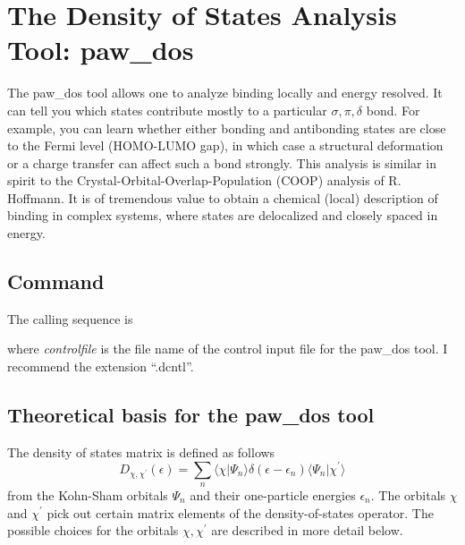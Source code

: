 \documentclass[final,12pt]{article}
\begin{document}
{{{{%
\newpage
\section{The Density of States Analysis Tool: paw\_dos}
The paw\_dos tool allows one to analyze binding locally and energy
resolved. It can tell you which states contribute mostly to a
particular $\sigma, \pi, \delta$ bond. For example, you can learn whether
either bonding and antibonding states are close to the Fermi level
(HOMO-LUMO gap), in which case a structural deformation or a charge
transfer can affect such a bond strongly. This analysis is similar in
spirit to the Crystal-Orbital-Overlap-Population (COOP) analysis of R.
Hoffmann. It is of tremendous value to obtain a chemical (local)
description of binding in complex systems, where states are
delocalized and closely spaced in energy.

\subsection{Command}

The calling sequence is

\bigskip{}\bigskip

\noindent
where {\it controlfile} is the file name of the control input file for
the paw\_dos tool. I recommend the extension ``.dcntl''.


\subsection{Theoretical basis for the paw\_dos tool}

The density of states matrix is defined as follows
\begin{equation}
  D_{\chi,\chi^\prime}(\epsilon)
 =\sum_n
  \langle\chi|\Psi_n\rangle
\delta(\epsilon-\epsilon_n)
\langle\Psi_n|\chi^\prime\rangle
\end{equation}
from the Kohn-Sham orbitals $\Psi_n$ and their one-particle energies
$\epsilon_n$. The orbitals $\chi$ and $\chi^\prime$ pick out certain
matrix elements of the density-of-states operator. The possible
choices for the orbitals $\chi,\chi^\prime$ are described in more
detail below.

}}}}
\end{document}
